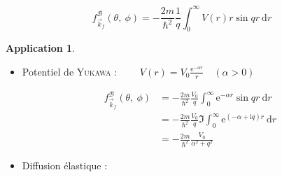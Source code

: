 \documentclass[12pt,a4paper,oneside,french]{book}
\renewcommand{\i}{\mathrm{i}}
\newcommand{\e}{\mathrm{e}}
\newcommand{\diff}{\mathrm{d}}
\theoremstyle{definition}
\theoremstyle{definition}
\theoremstyle{definition}
\theoremstyle{remark}
\theoremstyle{definition}
\newtheorem*{application}{Application}
\begin{document}
    \begin{equation*}
        {f}_{{\vec{k}}_{f}}^{\mathcal{B}}(\theta, \ \phi) = -\frac{2m}{{\hbar}^{2}} \frac{1}{q} \int_{0}^{\infty} V(r) r \sin{q r} \ \diff r
    \end{equation*}
    
    \bigskip
    
    \begin{application}
        \leavevmode
        
        \begin{itemize}
            \itemsep2em
            
            \item 
            Potentiel de \textsc{Yukawa} : $\qquad V(r) = {V}_{0} \frac{{\e}^{- \alpha r}}{r} \quad (\alpha > 0)$
            
            \begin{equation*}
            \begin{split}
                {f}_{{\vec{k}}_{f}}^{\mathcal{B}}(\theta, \ \phi) 
                    &= -\frac{2m}{{\hbar}^{2}} \frac{{V}_{0}}{q} \int_{0}^{\infty} {\e}^{- \alpha r} \sin{q r} \ \diff r \\
                    &= -\frac{2m}{{\hbar}^{2}} \frac{{V}_{0}}{q} \Im \int_{0}^{\infty} {\e}^{(- \alpha + \i q) r} \ \diff r \\
                    &= -\frac{2m}{{\hbar}^{2}} \frac{{V}_{0}}{{\alpha}^{2} + {q}^{2}} 
            \end{split}
            \end{equation*}
            
            \item
            Diffusion élastique :
            
            \begin{figure}[H]
                \centering
                
\end{figure}
\end{itemize}
\end{application}
\end{document}
